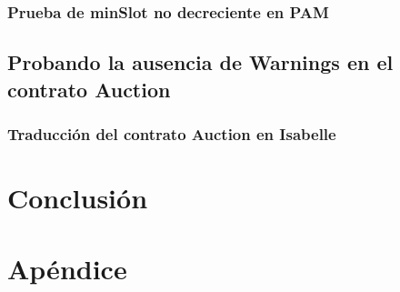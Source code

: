\documentclass[12pt]{book}
\begin{document}
\subsection{Prueba de minSlot no decreciente en PAM }

\section{Probando la ausencia de Warnings en el contrato Auction}

\subsection{Traducción del contrato Auction en Isabelle}


\chapter{Conclusión}


\chapter{Apéndice}




\end{document}
